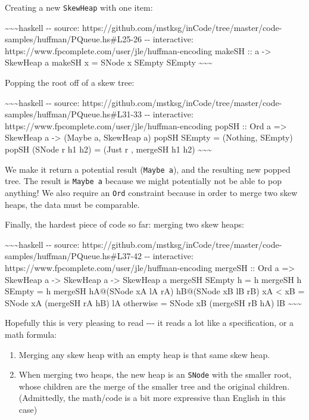 \documentclass[]{article}
\begin{document}
Creating a new \texttt{SkewHeap} with one item:

\textasciitilde{}\textasciitilde{}\textasciitilde{}haskell -\/- source:
https://github.com/mstksg/inCode/tree/master/code-samples/huffman/PQueue.hs\#L25-26
-\/- interactive: https://www.fpcomplete.com/user/jle/huffman-encoding makeSH ::
a -\textgreater{} SkewHeap a makeSH x = SNode x SEmpty SEmpty
\textasciitilde{}\textasciitilde{}\textasciitilde{}

Popping the root off of a skew tree:

\textasciitilde{}\textasciitilde{}\textasciitilde{}haskell -\/- source:
https://github.com/mstksg/inCode/tree/master/code-samples/huffman/PQueue.hs\#L31-33
-\/- interactive: https://www.fpcomplete.com/user/jle/huffman-encoding popSH ::
Ord a =\textgreater{} SkewHeap a -\textgreater{} (Maybe a, SkewHeap a) popSH
SEmpty = (Nothing, SEmpty) popSH (SNode r h1 h2) = (Just r , mergeSH h1 h2)
\textasciitilde{}\textasciitilde{}\textasciitilde{}

We make it return a potential result (\texttt{Maybe\ a}), and the resulting new
popped tree. The result is \texttt{Maybe\ a} because we might potentially not be
able to pop anything! We also require an \texttt{Ord} constraint because in
order to merge two skew heaps, the data must be comparable.

Finally, the hardest piece of code so far: merging two skew heaps:

\textasciitilde{}\textasciitilde{}\textasciitilde{}haskell -\/- source:
https://github.com/mstksg/inCode/tree/master/code-samples/huffman/PQueue.hs\#L37-42
-\/- interactive: https://www.fpcomplete.com/user/jle/huffman-encoding mergeSH
:: Ord a =\textgreater{} SkewHeap a -\textgreater{} SkewHeap a -\textgreater{}
SkewHeap a mergeSH SEmpty h = h mergeSH h SEmpty = h mergeSH hA@(SNode xA lA rA)
hB@(SNode xB lB rB) \textbar{} xA \textless{} xB = SNode xA (mergeSH rA hB) lA
\textbar{} otherwise = SNode xB (mergeSH rB hA) lB
\textasciitilde{}\textasciitilde{}\textasciitilde{}

Hopefully this is very pleasing to read -\/-\/- it reads a lot like a
specification, or a math formula:

\begin{enumerate}
\tightlist
\item
  Merging any skew heap with an empty heap is that same skew heap.
\item
  When merging two heaps, the new heap is an \texttt{SNode} with the smaller
  root, whose children are the merge of the smaller tree and the original
  children. (Admittedly, the math/code is a bit more expressive than English in
  this case)
\end{enumerate}
\end{document}
